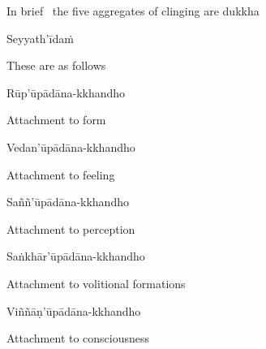 \begin{english}
  In brief \breathmark\ the five aggregates of clinging are dukkha\ifdigital\makeatletter\hyperlink{endnote15-appendix}\makeatother\fi
\end{english}

Seyyath'īdaṁ

\begin{english}
  These are as follows
\end{english}

Rūp'ūpādāna-kkhandho

\begin{english}
  Attachment to form
\end{english}

\ifbfive\clearpage\fi

Vedan'ūpādāna-kkhandho

\begin{english}
  Attachment to feeling
\end{english}

Saññ'ūpādāna-kkhandho

\begin{english}
  Attachment to perception
\end{english}

\ifninebythirteen\clearpage\fi

Saṅkhār'ūpādāna-kkhandho

\begin{english}
  Attachment to volitional formations\ifdigital\makeatletter\hyperlink{endnote16-appendix}\makeatother\fi
\end{english}

Viññāṇ'ūpādāna-kkhandho

\begin{english}
  Attachment to consciousness\ifdigital\makeatletter\hyperlink{endnote17-appendix}\makeatother\fi
\end{english}

